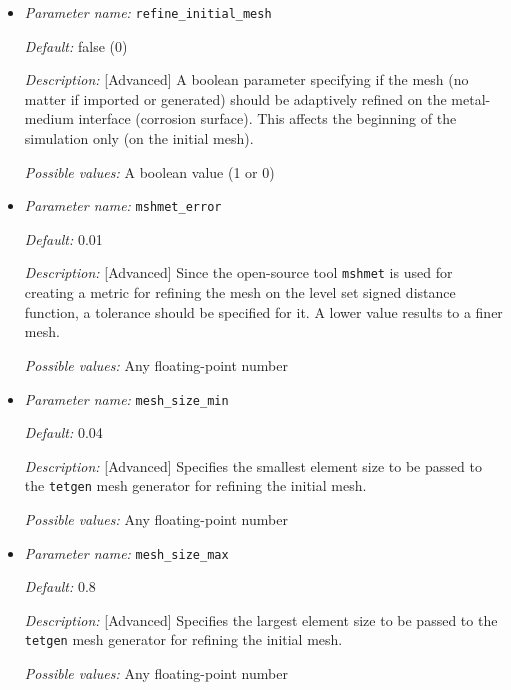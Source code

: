 \begin{itemize}
{\it Description:} [Standard] Number of elements on each edge of the container box, so a higher number means a finer mesh. The mesh size of the cuboid will be adjusted accordingly or can be adaptively refined by setting parameter {\tt refine\_initial\_mesh} to TRUE.

{\it Possible values:} Any positive integer number 


\item {\it Parameter name:} {\tt refine\_initial\_mesh}
\label{parameters:refine_initial_mesh}


{\it Default:} false (0)

{\it Description:} [Advanced] A boolean parameter specifying if the mesh (no matter if imported or generated) should be adaptively refined on the metal-medium interface (corrosion surface). This affects the beginning of the simulation only (on the initial mesh).

{\it Possible values:} A boolean value (1 or 0)


\item {\it Parameter name:} {\tt mshmet\_error}
\label{parameters:mshmet_error}


{\it Default:} 0.01

{\it Description:} [Advanced] Since the open-source tool {\tt mshmet} is used for creating a metric for refining the mesh on the level set signed distance function, a tolerance should be specified for it. A lower value results to a finer mesh.

{\it Possible values:} Any floating-point number


\item {\it Parameter name:} {\tt mesh\_size\_min}
\label{parameters:mesh_size_min}


{\it Default:} 0.04

{\it Description:} [Advanced] Specifies the smallest element size to be passed to the {\tt tetgen} mesh generator for refining the initial mesh.

{\it Possible values:} Any floating-point number


\item {\it Parameter name:} {\tt mesh\_size\_max}
\label{parameters:mesh_size_max}


{\it Default:} 0.8

{\it Description:} [Advanced] Specifies the largest element size to be passed to the {\tt tetgen} mesh generator for refining the initial mesh.

{\it Possible values:} Any floating-point number

\end{itemize}



